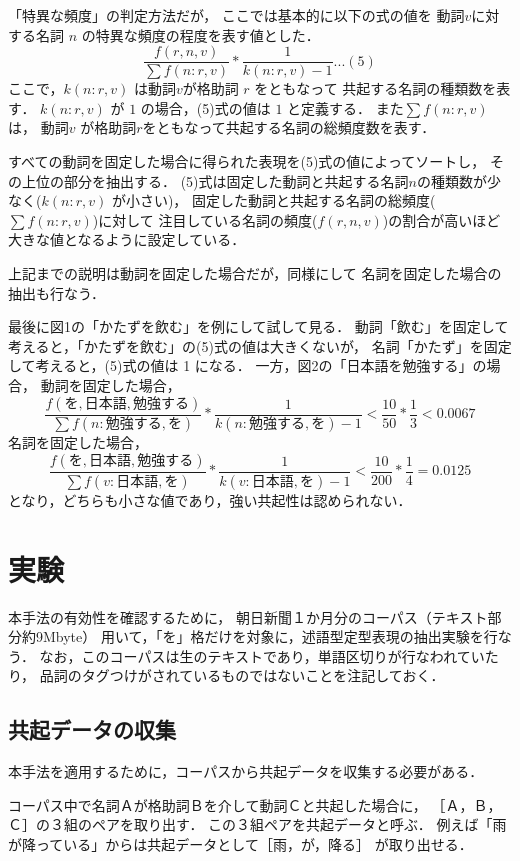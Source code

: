 「特異な頻度」の判定方法だが，
ここでは基本的に以下の式の値を
動詞\( v \)に対する名詞 \( n \) の特異な頻度の程度を表す値とした．
\[
\frac{f(r,n,v)}{\sum f(n: r,v)}*\frac{1}{k(n:r,v) - 1} ...(5)
\]
ここで，\( k(n: r,v) \) は動詞\( v \)が格助詞 \( r \) をともなって
共起する名詞の種類数を表す．
\( k(n: r,v) \) が \( 1 \) の場合，(5)式の値は \( 1 \) と定義する．
また\(\sum f(n:r,v) \) は，
動詞\( v \) が格助詞\( r \)をともなって共起する名詞の総頻度数を表す．

すべての動詞を固定した場合に得られた表現を(5)式の値によってソートし，
その上位の部分を抽出する．
(5)式は固定した動詞と共起する名詞\( n \)の種類数が少なく(\( k(n: r,v) \) が小さい)，
固定した動詞と共起する名詞の総頻度(\(\sum f(n:r,v) \))に対して
注目している名詞の頻度(\( f(r,n,v) \))の割合が高いほど
大きな値となるように設定している．

上記までの説明は動詞を固定した場合だが，同様にして
名詞を固定した場合の抽出も行なう．

最後に図1の「かたずを飲む」を例にして試して見る．
動詞「飲む」を固定して考えると，「かたずを飲む」の(5)式の値は大きくないが，
名詞「かたず」を固定して考えると，(5)式の値は 1 になる．
一方，図2の「日本語を勉強する」の場合，
動詞を固定した場合，
\[
\frac{f(を,日本語,勉強する)}{\sum f(n:勉強する,を)}*
\frac{1}{k(n:勉強する,を)-1} < 
\frac{10}{50}*\frac{1}{3} < 0.0067
\]
名詞を固定した場合，
\[
\frac{f(を,日本語,勉強する)}{\sum f(v:日本語,を)}*
\frac{1}{k(v:日本語,を)-1} < 
\frac{10}{200}*\frac{1}{4} = 0.0125
\]
となり，どちらも小さな値であり，強い共起性は認められない．

\section{実験}

本手法の有効性を確認するために，
朝日新聞１か月分のコーパス（テキスト部分約9Mbyte）
用いて，「を」格だけを対象に，述語型定型表現の抽出実験を行なう．
なお，このコーパスは生のテキストであり，単語区切りが行なわれていたり，
品詞のタグつけがされているものではないことを注記しておく．

\subsection{共起データの収集}

本手法を適用するために，コーパスから共起データを収集する必要がある．

コーパス中で名詞Ａが格助詞Ｂを介して動詞Ｃと共起した場合に，
［Ａ，Ｂ，Ｃ］の３組のペアを取り出す．
この３組ペアを共起データと呼ぶ．
例えば「雨が降っている」からは共起データとして［雨，が，降る］
が取り出せる．


